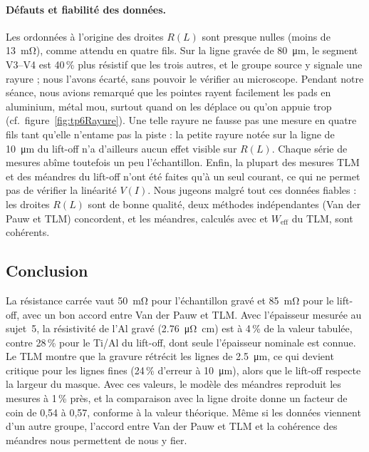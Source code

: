 \paragraph{Défauts et fiabilité des données.}
Les ordonnées à l'origine des droites $R(L)$ sont presque nulles (moins de \qty{13}{\milli\ohm}), comme attendu en quatre fils. Sur la ligne gravée de \qty{80}{\micro\metre}, le segment V3--V4 est 40\,\% plus résistif que les trois autres, et le groupe source y signale une rayure ; nous l'avons écarté, sans pouvoir le vérifier au microscope. Pendant notre séance, nous avions remarqué que les pointes rayent facilement les pads en aluminium, métal mou, surtout quand on les déplace ou qu'on appuie trop (cf.~figure~\ref{fig:tp6Rayure}). Une telle rayure ne fausse pas une mesure en quatre fils tant qu'elle n'entame pas la piste : la petite rayure notée sur la ligne de \qty{10}{\micro\metre} du lift-off n'a d'ailleurs aucun effet visible sur $R(L)$. Chaque série de mesures abîme toutefois un peu l'échantillon. Enfin, la plupart des mesures TLM et des méandres du lift-off n'ont été faites qu'à un seul courant, ce qui ne permet pas de vérifier la linéarité $V(I)$. Nous jugeons malgré tout ces données fiables : les droites $R(L)$ sont de bonne qualité, deux méthodes indépendantes (Van der Pauw et TLM) concordent, et les méandres, calculés avec \Rsq{} et $W_\text{eff}$ du TLM, sont cohérents.

\subsection{Conclusion}
La résistance carrée vaut 50~\unit{\milli\ohm} pour l'échantillon gravé et 85~\unit{\milli\ohm} pour le lift-off, avec un bon accord entre Van der Pauw et TLM. Avec l'épaisseur mesurée au sujet~5, la résistivité de l'Al gravé (\qty{2,76}{\micro\ohm\centi\metre}) est à 4\,\% de la valeur tabulée, contre 28\,\% pour le Ti/Al du lift-off, dont seule l'épaisseur nominale est connue. Le TLM montre que la gravure rétrécit les lignes de \qty{2,5}{\micro\metre}, ce qui devient critique pour les lignes fines (24\,\% d'erreur à \qty{10}{\micro\metre}), alors que le lift-off respecte la largeur du masque. Avec ces valeurs, le modèle des méandres reproduit les mesures à 1\,\% près, et la comparaison avec la ligne droite donne un facteur de coin de 0,54 à 0,57, conforme à la valeur théorique. Même si les données viennent d'un autre groupe, l'accord entre Van der Pauw et TLM et la cohérence des méandres nous permettent de nous y fier.